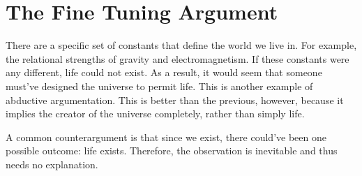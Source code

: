 \documentclass{article}
\begin{document}
\section{The Fine Tuning Argument}

There are a specific set of constants that define the world we live in. For
example, the relational strengths of gravity and electromagnetism. If these
constants were any different, life could not exist. As a result, it would seem
that someone must've designed the universe to permit life. This is another
example of abductive argumentation. This is better than the previous, however,
because it implies the creator of the universe completely, rather than simply
life.

A common counterargument is that since we exist, there could've been one
possible outcome: life exists. Therefore, the observation is inevitable and
thus needs no explanation.
\end{document}
